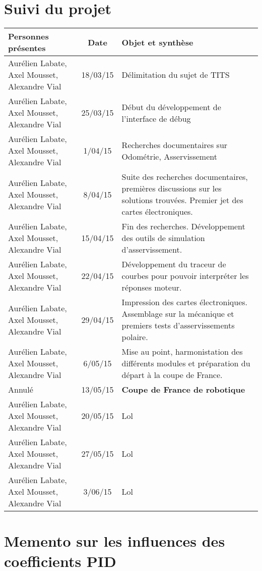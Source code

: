 \chapter{Suivi du projet}
    \begin{tabular}{|p{3cm}|c|p{10cm}|}
        \hline
        Personnes présentes & Date & Objet et synthèse\\
        \hline
        \hline
        Aurélien Labate, Axel Mousset, Alexandre Vial & 18/03/15 & Délimitation du sujet de TITS\\
        \hline
        Aurélien Labate, Axel Mousset, Alexandre Vial & 25/03/15 & Début du développement de l'interface de débug\\
        \hline
        Aurélien Labate, Axel Mousset, Alexandre Vial & 1/04/15 & Recherches documentaires sur Odométrie, Asservissement\\
        \hline
        Aurélien Labate, Axel Mousset, Alexandre Vial & 8/04/15 & Suite des recherches documentaires, premières discussions sur les solutions trouvées. Premier jet des cartes électroniques.\\
        \hline
        Aurélien Labate, Axel Mousset, Alexandre Vial & 15/04/15 & Fin des recherches. Développement des outils de simulation d'asservissement.\\
        \hline
        Aurélien Labate, Axel Mousset, Alexandre Vial & 22/04/15 & Développement du traceur de courbes pour pouvoir interpréter les réponses moteur.\\
        \hline
        Aurélien Labate, Axel Mousset, Alexandre Vial & 29/04/15 & Impression des cartes électroniques. Assemblage sur la mécanique et premiers tests d'asservissements polaire.\\
        \hline
        Aurélien Labate, Axel Mousset, Alexandre Vial & 6/05/15 & Mise au point, harmonistation des différents modules et préparation du départ à la coupe de France.\\
        \hline
        Annulé & 13/05/15 & \textbf{Coupe de France de robotique}\\
        \hline
        Aurélien Labate, Axel Mousset, Alexandre Vial & 20/05/15 & Lol\\
        \hline
        Aurélien Labate, Axel Mousset, Alexandre Vial & 27/05/15 & Lol\\
        \hline
        Aurélien Labate, Axel Mousset, Alexandre Vial & 3/06/15 & Lol\\
        \hline
     \end{tabular}


\newpage
\chapter{Memento sur les influences des coefficients PID}